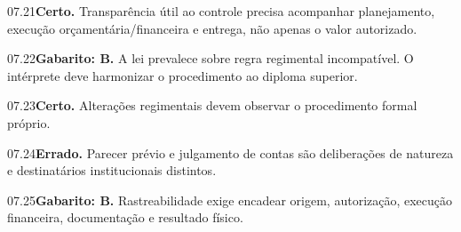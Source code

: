 \begin{solucao}{07.21}\textbf{Certo.} Transparência útil ao controle precisa acompanhar planejamento, execução orçamentária/financeira e entrega, não apenas o valor autorizado.\end{solucao}
\begin{solucao}{07.22}\textbf{Gabarito: B.} A lei prevalece sobre regra regimental incompatível. O intérprete deve harmonizar o procedimento ao diploma superior.\end{solucao}
\begin{solucao}{07.23}\textbf{Certo.} Alterações regimentais devem observar o procedimento formal próprio.\end{solucao}
\begin{solucao}{07.24}\textbf{Errado.} Parecer prévio e julgamento de contas são deliberações de natureza e destinatários institucionais distintos.\end{solucao}
\begin{solucao}{07.25}\textbf{Gabarito: B.} Rastreabilidade exige encadear origem, autorização, execução financeira, documentação e resultado físico.\end{solucao}

